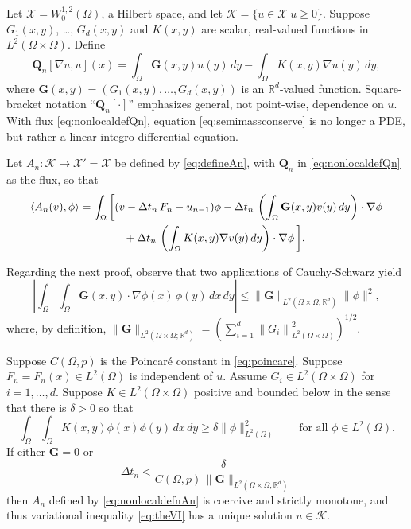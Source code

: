 \documentclass[final,leqno,onefignum,onetabnum]{siamltex1213bueler}
\newcommand\bG{\mathbf{G}}
\newcommand\bQ{\mathbf{Q}}
\renewcommand{\grad}{\nabla}
\newcommand{\ip}[2]{\ensuremath{\left<#1,#2\right>}}
\newcommand\RR{\mathbb{R}}
\begin{document}
Let $\mathcal{X} = W_0^{1,2}(\Omega)$, a Hilbert space, and let $\mathcal{K}=\{u\in\mathcal{X}|u\ge 0\}$.  Suppose $G_1(x,y)$, \dots, $G_d(x,y)$ and $K(x,y)$ are scalar, real-valued functions in $L^2(\Omega\times \Omega)$.  Define
\begin{equation}
\bQ_n[\grad u,u](x) = \int_\Omega \bG(x,y) u(y)\,dy - \int_\Omega K(x,y) \grad u(y)\,dy, \label{eq:nonlocaldefQn}
\end{equation}
where $\bG(x,y) = (G_1(x,y), \dots, G_d(x,y))$ is an $\RR^d$-valued function.  Square-bracket notation ``$\bQ_n[\cdot]$'' emphasizes general, not point-wise, dependence on $u$.  With flux \eqref{eq:nonlocaldefQn}, equation \eqref{eq:semimassconserve} is no longer a PDE, but rather a linear integro-differential equation.

Let $A_n:\mathcal{K} \to \mathcal{X}'=\mathcal{X}$ be defined by \eqref{eq:defineAn}, with $\bQ_n$ in \eqref{eq:nonlocaldefQn} as the flux, so that
\begin{align}
    \ip{A_n(v)}{\phi} &= \int_\Omega \bigg[(v - \Delta t_n\,F_n - u_{n-1})\phi - \Delta t_n\,\left(\int_\Omega \bG(x,y) v(y)\,dy\right)\cdot \grad \phi \label{eq:nonlocaldefnAn} \\
                      &\qquad\qquad + \Delta t_n\,\left(\int_\Omega K(x,y) \grad v(y)\,dy\right)\cdot \grad \phi\,\bigg]. \notag
\end{align}

Regarding the next proof, observe that two applications of Cauchy-Schwarz yield
\begin{equation}
\left|\int_\Omega \int_\Omega \bG(x,y) \cdot \grad \phi(x)\,\phi(y) \,dx\,dy\right|
  \le \|\bG\|_{L^2(\Omega\times\Omega;\RR^d)} \|\phi\|^2,   \label{eq:nonlocalGbound}
\end{equation}
where, by definition, $\|\bG\|_{L^2(\Omega\times\Omega;\RR^d)} = \left(\sum_{i=1}^d \left\|G_i\right\|_{L^2(\Omega \times \Omega)}^2\right)^{1/2}$.

\begin{theorem}  \label{thm:nonlocalwellposed}  Suppose $C(\Omega,p)$ is the Poincar\'e constant in \eqref{eq:poincare}.  Suppose $F_n=F_n(x) \in L^2(\Omega)$ is independent of $u$.  Assume $G_i \in L^2(\Omega\times\Omega)$ for $i=1,\dots,d$.  Suppose $K \in L^2(\Omega\times\Omega)$ positive and bounded below \cite{PorterStirling1990} in the sense that there is $\delta>0$ so that
\begin{equation}
   \int_\Omega \int_\Omega K(x,y) \phi(x) \phi(y)\,dx\,dy \ge \delta \|\phi\|_{L^2(\Omega)}^2 \qquad \text{for all } \phi \in L^2(\Omega).  \label{eq:nonlocalKpos}
\end{equation}
If either $\bG=0$ or
\begin{equation}
  \Delta t_n < \frac{\delta}{C(\Omega,p)\, \|\bG\|_{L^2(\Omega\times\Omega;\RR^d)}}  \label{eq:nonlocaldtcond}
\end{equation}
then $A_n$ defined by \eqref{eq:nonlocaldefnAn} is coercive and strictly monotone, and thus variational inequality \eqref{eq:theVI} has a unique solution $u\in\mathcal{K}$.
\end{theorem}
\end{document}
